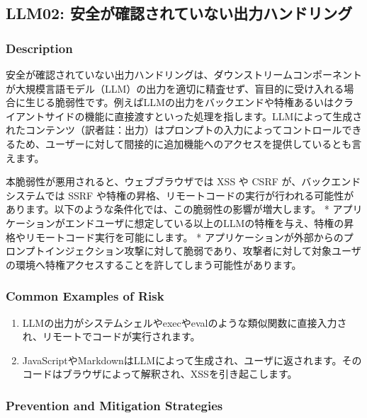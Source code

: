 \documentclass[
]{article}
\author{}
\date{}
\providecommand{\tightlist}{%
  \setlength{\itemsep}{0pt}\setlength{\parskip}{0pt}}
\begin{document}
\subsection{LLM02:
安全が確認されていない出力ハンドリング}\label{llm02-ux5b89ux5168ux304cux78baux8a8dux3055ux308cux3066ux3044ux306aux3044ux51faux529bux30cfux30f3ux30c9ux30eaux30f3ux30b0}

\subsubsection{Description}\label{description}

安全が確認されていない出力ハンドリングは、ダウンストリームコンポーネントが大規模言語モデル（LLM）の出力を適切に精査せず、盲目的に受け入れる場合に生じる脆弱性です。例えばLLMの出力をバックエンドや特権あるいはクライアントサイドの機能に直接渡すといった処理を指します。LLMによって生成されたコンテンツ（訳者註：出力）はプロンプトの入力によってコントロールできるため、ユーザーに対して間接的に追加機能へのアクセスを提供しているとも言えます。

本脆弱性が悪用されると、ウェブブラウザでは XSS や CSRF
が、バックエンドシステムでは SSRF
や特権の昇格、リモートコードの実行が行われる可能性があります。以下のような条件化では、この脆弱性の影響が増大します。
*
アプリケーションがエンドユーザに想定している以上のLLMの特権を与え、特権の昇格やリモートコード実行を可能にします。
*
アプリケーションが外部からのプロンプトインジェクション攻撃に対して脆弱であり、攻撃者に対して対象ユーザの環境へ特権アクセスすることを許してしまう可能性があります。

\subsubsection{Common Examples of Risk}\label{common-examples-of-risk}

\begin{enumerate}
\def\labelenumi{\arabic{enumi}.}
\tightlist
\item
  LLMの出力がシステムシェルやexecやevalのような類似関数に直接入力され、リモートでコードが実行されます。
\item
  JavaScriptやMarkdownはLLMによって生成され、ユーザに返されます。そのコードはブラウザによって解釈され、XSSを引き起こします。
\end{enumerate}

\subsubsection{Prevention and Mitigation
Strategies}\label{prevention-and-mitigation-strategies}
\end{document}
